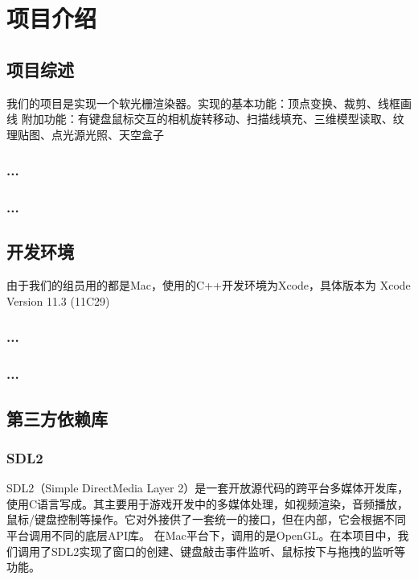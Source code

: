 

    \chapter{项目介绍}

    \section{项目综述}
        \begin{spacing}{2.5}
我们的项目是实现一个软光栅渲染器。实现的基本功能：顶点变换、裁剪、线框画线
	附加功能：有键盘鼠标交互的相机旋转移动、扫描线填充、三维模型读取、纹理贴图、点光源光照、天空盒子     	
        \end{spacing}


    \subsection{...}

    \subsection{...}


    \section{开发环境}
	        \begin{spacing}{2.5}
由于我们的组员用的都是Mac，使用的C++开发环境为Xcode，具体版本为 Xcode Version 11.3 (11C29)
	        \end{spacing}


	
    \subsection{...}

    

    \subsection{...}




    \section{第三方依赖库}


    \subsection{SDL2}
\begin{spacing}{2.5}
   SDL2（Simple DirectMedia Layer 2）是一套开放源代码的跨平台多媒体开发库，使用C语言写成。其主要用于游戏开发中的多媒体处理，如视频渲染，音频播放，鼠标/键盘控制等操作。它对外接供了一套统一的接口，但在内部，它会根据不同平台调用不同的底层API库。
   在Mac平台下，调用的是OpenGL。在本项目中，我们调用了SDL2实现了窗口的创建、键盘敲击事件监听、鼠标按下与拖拽的监听等功能。
\end{spacing}



